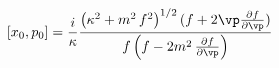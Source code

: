 \begin{equation}\label{a.5}
 [x_{0},p_{0}]=\frac{i}{\kappa}\frac{\left(\kappa^{2}+m^2\, f^{2}\right)^{1/2}
 (f+2\vp\frac{\partial f}{\partial \vp})}{f\left(f-2m^2\,
 \frac{\partial f}{\partial \vp}\right)}
\end{equation}

